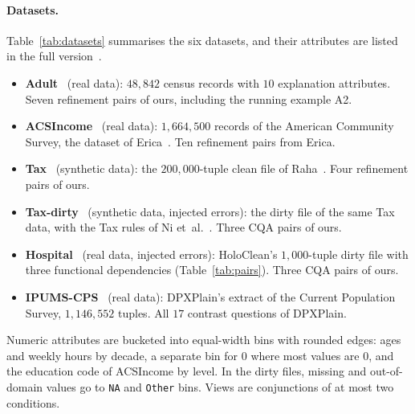 \paragraph{Datasets.}
Table~\ref{tab:datasets} summarises the six datasets, and their attributes are listed in \ifpaper the full version~\cite{fullversion}\else {}\fi.
\begin{itemize}[leftmargin=*,itemsep=1pt,topsep=2pt]
  \item \textbf{Adult}~\cite{adult-uci} (real data): $48{,}842$ census records with $10$ explanation attributes. Seven refinement pairs of ours, including the running example A2.
  \item \textbf{ACSIncome}~\cite{DingHMS21} (real data): $1{,}664{,}500$ records of the American Community Survey, the dataset of Erica~\cite{LMSJ23,ERICA}. Ten refinement pairs from Erica.
  \item \textbf{Tax}~\cite{BohannonFGJK07} (synthetic data): the $200{,}000$-tuple clean file of Raha~\cite{MahdaviAFMOST19}. Four refinement pairs of ours.
  \item \textbf{Tax-dirty}~\cite{MahdaviAFMOST19} (synthetic data, injected errors): the dirty file of the same Tax data, with the Tax rules of Ni et~al.~\cite{NiMZWLY24}. Three CQA pairs of ours.
  \item \textbf{Hospital}~\cite{rekatsinas2017} (real data, injected errors): HoloClean's $1{,}000$-tuple dirty file with three functional dependencies (Table~\ref{tab:pairs}). Three CQA pairs of ours.
  \item \textbf{IPUMS-CPS}~\cite{TaoGMR22} (real data): DPXPlain's extract of the Current Population Survey, $1{,}146{,}552$ tuples. All $17$ contrast questions of DPXPlain.
\end{itemize}
Numeric attributes are bucketed into equal-width bins with rounded edges: ages and weekly hours by decade, a separate bin for $0$ where most values are $0$, and the education code of ACSIncome by level.
In the dirty files, missing and out-of-domain values go to \texttt{NA} and \texttt{Other} bins.
Views are conjunctions of at most two conditions.

